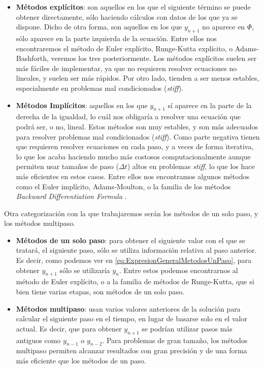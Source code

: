\begin{itemize}
	\item \textbf{Métodos explícitos}: son aquellos en los que el siguiente término se puede obtener directamente, sólo haciendo cálculos con datos de los que ya se dispone. Dicho de otra forma, son aquellos en los que $y_{n+1}$ no aparece en $\Phi$, sólo aparece en la parte izquierda de la ecuación. Entre ellos nos encontraremos el método de Euler explícito, Runge-Kutta explícito, o Adams-Bashforth, veremos los tres posteriormente. Los métodos explícitos suelen ser más fáciles de implementar, ya que no requieren resolver ecuaciones no lineales, y suelen ser más rápidos. Por otro lado, tienden a ser menos estables, especialmente en problemas mal condicionados (\textit{stiff}).
	
	\item \textbf{Métodos Implícitos}: aquellos en los que $y_{n+1}$ sí aparece en la parte de la derecha de la igualdad, lo cuál nos obligaría a resolver una ecuación que podrá ser, o no, lineal. Estos métodos son muy estables, y son más adecuados para resolver problemas mal condicionados (\textit{stiff}). Como parte negativa tienen que requieren resolver ecuaciones en cada paso, y a veces de forma iterativa, lo que los acaba haciendo mucho más costosos computacionalmente aunque permiten usar tamaños de paso ($\Delta t$) altos en problemas \textit{stiff}, lo que los hace más eficientes en estos casos. Entre ellos nos encontramos algunos métodos como el Euler implícito, Adams-Moulton, o la familia de los métodos \textit{Backward Differentiation Formula} \cite{Ascher1998}.
\end{itemize}

Otra categorización con la que trabajaremos serán los métodos de un solo paso, y los métodos multipaso.
\begin{itemize}
	\item \textbf{Métodos de un solo paso}: para obtener el siguiente valor con el que se tratará, el siguiente paso, sólo se utiliza información relativa al paso anterior. Es decir, como podemos ver en \ref{eq:ExpresionGeneralMetodosUnPaso}, para obtener $y_{n+1}$ sólo se utilizaría $y_n$. Entre estos podemos encontrarnos al método de Euler explícito, o a la familia de métodos de Runge-Kutta, que si bien tiene varias etapas, son métodos de un solo paso.
	\item \textbf{Métodos multipaso}: usan varios valores anteriores de la solución para calcular el siguiente paso en el tiempo, en lugar de basarse solo en el valor actual. Es decir, que para obtener $y_{n+1}$ se podrían utilizar pasos más antiguos como $y_{n-1}$ o $y_{n-2}$. Para problemas de gran tamaño, los métodos multipaso permiten alcanzar resultados con gran precisión y de una forma más eficiente que los métodos de un paso.
\end{itemize}


